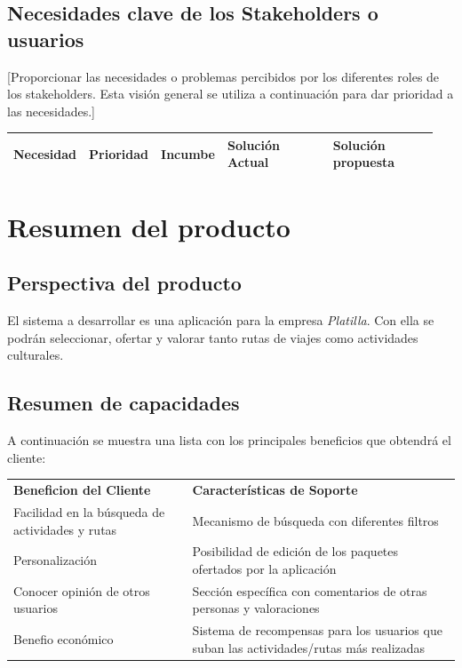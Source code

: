 \documentclass[11pt]{article}
\begin{document}
\subsection{Necesidades clave de los Stakeholders o usuarios}
[Proporcionar las necesidades o problemas percibidos por los diferentes roles de los stakeholders. Esta visión general se utiliza a continuación para dar prioridad a las necesidades.]
          
\begin{table}[H]
  \centering
  \begin{tabular}{p{0.15\linewidth}p{0.15\linewidth}p{0.15\linewidth}p{0.25\linewidth}p{0.25\linewidth}}
    \toprule
    \textbf{Necesidad} & \textbf{Prioridad} & \textbf{Incumbe} & \textbf{Solución Actual} & \textbf{Solución propuesta} \\
    \midrule
    \bottomrule
  \end{tabular}
\end{table}
\newpage

\section{Resumen del producto}
\subsection{Perspectiva del producto}
 El sistema a desarrollar es una aplicación para la empresa \textit{Platilla}. Con ella se podrán seleccionar, ofertar y valorar tanto rutas de viajes como actividades culturales.


\subsection{Resumen de capacidades}
A continuación se muestra una lista con los principales beneficios que obtendrá el cliente:

\begin{table}[H]
  \centering
  \begin{tabular}{p{0.4\linewidth}p{0.6\linewidth}}
    \toprule
    \textbf{Beneficion del Cliente} & \textbf{Características de Soporte} \\
     Facilidad en la búsqueda de actividades y rutas & Mecanismo de búsqueda con diferentes filtros \\
     Personalización & Posibilidad de edición de los paquetes ofertados por la aplicación \\
     Conocer opinión de otros usuarios & Sección específica con comentarios de otras personas y valoraciones\\
     Benefio económico & Sistema de recompensas para los usuarios que suban las actividades/rutas más realizadas \\
    \midrule
    \bottomrule
  \end{tabular}
\end{table}
\end{document}

